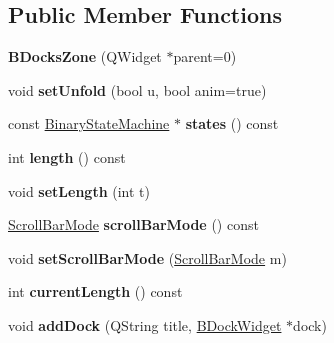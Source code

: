\subsection*{\-Public \-Member \-Functions}
\begin{DoxyCompactItemize}
\item 
\hypertarget{class_b_docks_zone_a2e49eff10d059d11b21080b386229350}{{\bfseries \-B\-Docks\-Zone} (\-Q\-Widget $\ast$parent=0)}\label{class_b_docks_zone_a2e49eff10d059d11b21080b386229350}

\item 
\hypertarget{class_b_docks_zone_aa5dbe8252e67c1c87baf2426261249c7}{void {\bfseries set\-Unfold} (bool u, bool anim=true)}\label{class_b_docks_zone_aa5dbe8252e67c1c87baf2426261249c7}

\item 
\hypertarget{class_b_docks_zone_a24dd59b11ef94e162302c8536a49f3ae}{const \hyperlink{class_binary_state_machine}{\-Binary\-State\-Machine} $\ast$ {\bfseries states} () const }\label{class_b_docks_zone_a24dd59b11ef94e162302c8536a49f3ae}

\item 
\hypertarget{class_b_docks_zone_a75f73b55f6766570f2af2e8b0f2e8437}{int {\bfseries length} () const }\label{class_b_docks_zone_a75f73b55f6766570f2af2e8b0f2e8437}

\item 
\hypertarget{class_b_docks_zone_ab8535df5e9b601099740e2a380ec0039}{void {\bfseries set\-Length} (int t)}\label{class_b_docks_zone_ab8535df5e9b601099740e2a380ec0039}

\item 
\hypertarget{class_b_docks_zone_abf7baab2867fc2cf78fded21720d0011}{\hyperlink{class_b_docks_zone_aaa04c632b39dce77b61a3a28b7418fdd}{\-Scroll\-Bar\-Mode} {\bfseries scroll\-Bar\-Mode} () const }\label{class_b_docks_zone_abf7baab2867fc2cf78fded21720d0011}

\item 
\hypertarget{class_b_docks_zone_a5f057fe2f659983eb19a1fac4db60c7f}{void {\bfseries set\-Scroll\-Bar\-Mode} (\hyperlink{class_b_docks_zone_aaa04c632b39dce77b61a3a28b7418fdd}{\-Scroll\-Bar\-Mode} m)}\label{class_b_docks_zone_a5f057fe2f659983eb19a1fac4db60c7f}

\item 
\hypertarget{class_b_docks_zone_aae4fe06f9d6ab8ea9edca8d3dde84022}{int {\bfseries current\-Length} () const }\label{class_b_docks_zone_aae4fe06f9d6ab8ea9edca8d3dde84022}

\item 
\hypertarget{class_b_docks_zone_ab18bd2b0737213b6a4a3487a555f961d}{void {\bfseries add\-Dock} (\-Q\-String title, \hyperlink{class_b_dock_widget}{\-B\-Dock\-Widget} $\ast$dock)}\label{class_b_docks_zone_ab18bd2b0737213b6a4a3487a555f961d}

\end{DoxyCompactItemize}
